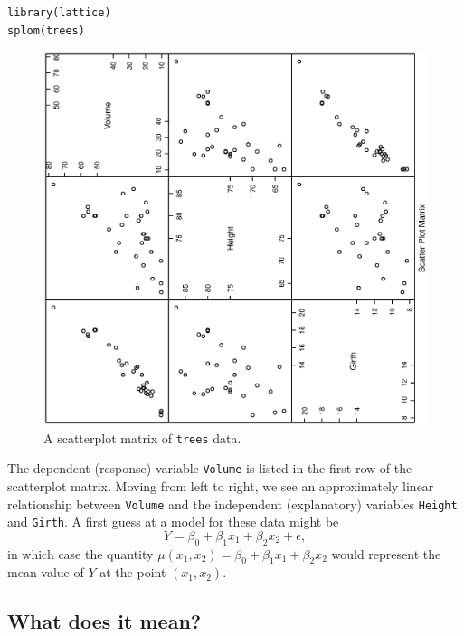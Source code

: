 \documentclass[captions=tableheading]{scrbook}
\begin{document}
\begin{example}
\begin{verbatim}
library(lattice)
splom(trees)
\end{verbatim}





\begin{figure}[th]
  \includegraphics[angle=270, totalheight=4in]{ps/splom-trees.ps}
  \caption[Scatterplot matrix of \texttt{trees} data]{\small A scatterplot matrix of \texttt{trees} data.}
  \label{fig:splom-trees}
\end{figure}

The dependent (response) variable \texttt{Volume} is listed in the first row of the scatterplot matrix. Moving from left to right, we see an approximately linear relationship between \texttt{Volume} and the independent (explanatory) variables \texttt{Height} and \texttt{Girth}. A first guess at a model for these data might be
\begin{equation}
Y=\beta_{0}+\beta_{1}x_{1}+\beta_{2}x_{2}+\epsilon,
\end{equation}
in which case the quantity \(\mu(x_{1},x_{2})=\beta_{0}+\beta_{1}x_{1}+\beta_{2}x_{2}\) would represent the mean value of \(Y\) at the point \((x_{1},x_{2})\).
\end{example}
\subsection{What does it mean?}
\label{sec-12-1-1}
\end{document}
